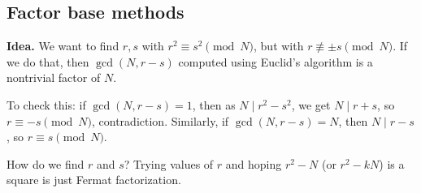 \documentclass{article}
\theoremstyle{definition}
\begin{document}
\subsection{Factor base methods}

\textbf{Idea.} We want to find $r,s$ with $r^2 \equiv s ^2 \pmod{N}$, but with $r \not\equiv \pm s\pmod{N}$. If we do that, then $\gcd(N,r-s)$ computed using Euclid's algorithm is a nontrivial factor of $N$.
\vspace{1mm}

To check this: if $\gcd(N,r-s)=1$, then as $N \mid r^2-s^2$, we get $N \mid r+s$, so $r \equiv -s \pmod{N}$, contradiction. Similarly, if $\gcd(N,r-s)=N$, then $N \mid r-s$, so $r \equiv s \pmod{N}$.
\vspace{1mm}

How do we find $r$ and $s$? Trying values of $r$ and hoping $r^2-N$ (or $r^2-kN$) is a square is just Fermat factorization. 
\vspace{1mm}
\end{document}
